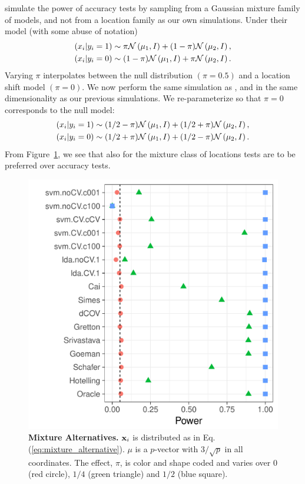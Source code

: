 \documentclass[onecolumn,draftclsnofoot]{IEEEtran}
\begin{document}
\cite{golland_permutation_2005} simulate the power of accuracy tests by sampling from a Gaussian mixture family of models, and not from a location family as our own simulations. 
Under their model (with some abuse of notation)
\begin{align*}
\begin{split}
(x_i|y_i=1) & \sim \pi \mathcal{N}\left(\mu_1,I\right)+ (1-\pi) \mathcal{N}\left(\mu_2,I\right), \\
(x_i|y_i=0) & \sim (1-\pi) \mathcal{N}\left(\mu_1,I\right)+ \pi \mathcal{N}\left(\mu_2,I\right).
\end{split}
\end{align*}
Varying $\pi$ interpolates between the null distribution $(\pi=0.5)$ and a location shift model $(\pi=0)$. 
We now perform the same simulation as \cite{golland_permutation_2005}, and in the same dimensionality as our previous simulations.
We re-parameterize so that $\pi=0$ corresponds to the null model:
\begin{align}
\begin{split}
\label{eq:mixture_alternative}
(x_i|y_i=1) & \sim (1/2-\pi) \gauss{\mu_1,I}+ (1/2+\pi) \gauss{\mu_2,I}, \\
(x_i|y_i=0) & \sim (1/2+\pi) \gauss{\mu_1,I}+ (1/2-\pi) \gauss{\mu_2,I}.	
\end{split}
\end{align}
From Figure~\ref{fig:file12}, we see that also for the mixture class of \cite{golland_permutation_2005} locations tests are to be preferred over accuracy tests. 


\begin{figure}[ht]
	\centering
	\includegraphics[width=0.7\columnwidth]{"art/file12"}
	\caption{\textbf{Mixture Alternatives.} $\mathbf{x}_i$ is distributed as in Eq.(\ref{eq:mixture_alternative}). 
		$\mu$ is a $p$-vector with $3/\sqrt{p}$ in all coordinates.
		The effect, $\pi$, is color and shape coded and varies over $0$ (red circle), $1/4$ (green triangle) and $1/2$ (blue square). }
	\label{fig:file12}
\end{figure}
\end{document}
